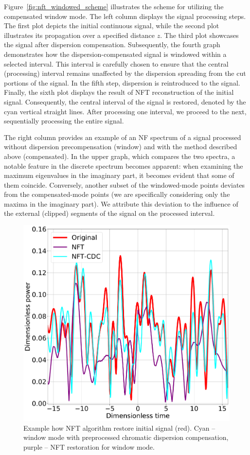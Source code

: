 Figure~\ref{fig:nft_windowed_scheme} illustrates the scheme for utilizing the compensated window mode. The left column displays the signal processing steps. The first plot depicts the initial continuous signal, while the second plot illustrates its propagation over a specified distance $z$. The third plot showcases the signal after dispersion compensation. Subsequently, the fourth graph demonstrates how the dispersion-compensated signal is windowed within a selected interval. This interval is carefully chosen to ensure that the central (processing) interval remains unaffected by the dispersion spreading from the cut portions of the signal. In the fifth step, dispersion is reintroduced to the signal. Finally, the sixth plot displays the result of NFT reconstruction of the initial signal. Consequently, the central interval of the signal is restored, denoted by the cyan vertical straight lines. After processing one interval, we proceed to the next, sequentially processing the entire signal.

The right column provides an example of an NF spectrum of a signal processed without dispersion precompensation (window) and with the method described above (compensated).
%
In the upper graph, which compares the two spectra, a notable feature in the discrete spectrum becomes apparent: when examining the maximum eigenvalues in the imaginary part, it becomes evident that some of them coincide. Conversely, another subset of the windowed-mode points deviates from the compensated-mode points (we are specifically considering only the maxima in the imaginary part). We attribute this deviation to the influence of the external (clipped) segments of the signal on the processed interval.


\begin{figure}[tbp]
    \centering
        \includegraphics[width=0.5\linewidth]{images/window/nft_comp_cdc_m4dbm_final.pdf}
    \caption{Example how NFT algorithm restore initial signal (red). Cyan -- window mode with preprocessed chromatic dispersion compensation, purple -- NFT restoration for window mode.}
    \label{fig:nft_dbp_nft_and_cdc}
\end{figure}

